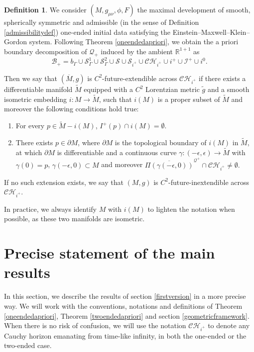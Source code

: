 \documentclass[10pt,a4paper]{article}
\theoremstyle{plain}
\theoremstyle{remark}
\theoremstyle{definition}
\newtheorem{defn}{Definition}[section]
\newcommand{\RR}{\mathbb{R}}
\theoremstyle{plain}
\theoremstyle{remark}
\theoremstyle{definition}
\newcommand{\barM}{\overline{M}}
\newcommand{\CH}{\mathcal{CH}_{i^+}}
\numberwithin{equation}{section}
\begin{document}
\begin{defn} \label{CHinext} We consider $(M,g_{\mu \nu}, \phi,F)$ the maximal development of smooth, spherically symmetric and admissible (in the sense of Definition \ref{admissibilitydef}) one-ended initial data satisfying the Einstein--Maxwell--Klein--Gordon system. Following Theorem \ref{oneendedapriori}, we obtain the a priori boundary decomposition of $\mathcal{Q_+}$ induced by the ambient $\RR^{1+1}$ as $$\mathcal{B_+}=b_{\Gamma}\cup \mathcal{S}_{\Gamma}^1 \cup  \mathcal{S}_{\Gamma}^2 \cup \mathcal{S}  \cup \mathcal{S}_{i^+}  \cup \CH \cup i^+ \cup \mathcal{I}^+ \cup i^0 .$$
	
	Then we say that $(\barM,g)$ is $C^2$-future-extendible across $\CH$ if there exists a differentiable manifold $\tilde{M}$ equipped with a $C^2$ Lorentzian metric $\tilde{g}$ and a smooth isometric embedding $i: M \rightarrow  \tilde{M}$, such that $i(M)$ is a proper subset of $\tilde{M}$ and moreover the following conditions hold true: \begin{enumerate}
		\item For every $p \in \tilde{M}-i(M)$, $I^+(p) \cap i(M) = \emptyset$.
		
		\item There exists $p\in \partial M$, where $ \partial M$ is the topological boundary of $i(M)$ in $\tilde{M}$, at which $\partial M$ is differentiable and a continuous curve $\gamma:(-\epsilon,\epsilon) \rightarrow \tilde{M}$ with $\gamma(0)=p$, $\gamma(-\epsilon,0) \subset M$ and moreover $ \overline{\Pi(\gamma(-\epsilon,0))}^{\mathcal{Q}^+} \cap \CH \neq \emptyset.$
	\end{enumerate} 
	
	
	
	
	If no such extension exists, we say that $(M,g)$ is $C^2$-future-inextendible across $\CH$.
\end{defn}


In practice, we always identify $M$ with $i(M)$ to lighten the notation when possible, as these two manifolds are isometric. \color{black}
\section{Precise statement of the main results} \label{results}

In this section, we describe the results of section \ref{firstversion} in a more precise way. We will work with the conventions, notations and definitions of Theorem \ref{oneendedapriori}, Theorem \ref{twoendedapriori} and section \ref{geometricframework}. When there is no risk of confusion, we will use the notation $\CH$ to denote any Cauchy horizon emanating from time-like infinity, in both the one-ended or the two-ended case.
\end{document}
